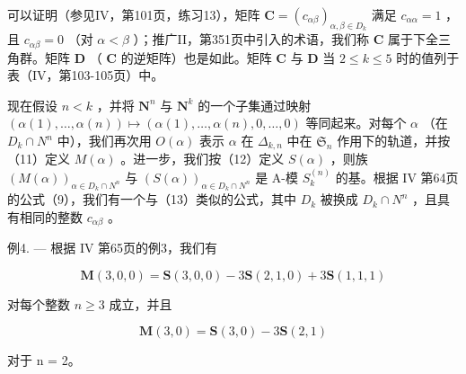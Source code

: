 可以证明（参见IV，第101页，练习13），矩阵 \(\mathbf{C} = (c_{\alpha \beta})_{\alpha, \beta \in D_k}\) 满足 \(c_{\alpha \alpha} = 1\) ，且 \(c_{\alpha \beta} = 0\) （对 \(\alpha < \beta\) ）；推广II，第351页中引入的术语，我们称 \(\mathbf{C}\) 属于下全三角群。矩阵 \(\mathbf{D}\) （ \(\mathbf{C}\) 的逆矩阵）也是如此。矩阵 \(\mathbf{C}\) 与 \(\mathbf{D}\) 当 \(2 \leqslant k \leqslant 5\) 时的值列于表（IV，第103-105页）中。

现在假设 \(n < k\) ，并将 \(\mathbf{N}^n\) 与 \(\mathbf{N}^k\) 的一个子集通过映射 \((\alpha(1), \ldots, \alpha(n)) \mapsto (\alpha(1), \ldots, \alpha(n), 0, \ldots, 0)\) 等同起来。对每个 \(\alpha\) （在 \(D_k \cap N^n\) 中），我们再次用 \(O(\alpha)\) 表示 \(\alpha\) 在 \(\Delta_{k,n}\) 中在 \(\mathfrak{S}_n\) 作用下的轨道，并按（11）定义 \(M(\alpha)\) 。进一步，我们按（12）定义 \(S(\alpha)\) ，则族 \((M(\alpha))_{\alpha \in D_k \cap N^n}\) 与 \((S(\alpha))_{\alpha \in D_k \cap N^n}\) 是 A-模 \(S_k^{(n)}\) 的基。根据 IV 第64页的公式（9），我们有一个与（13）类似的公式，其中 \(D_k\) 被换成 \(D_k \cap N^n\) ，且具有相同的整数 \(c_{\alpha\beta}\) 。

例4. --- 根据 IV 第65页的例3，我们有

\[
\mathbf {M} (3, 0, 0) = \mathbf {S} (3, 0, 0) - 3 \mathbf {S} (2, 1, 0) + 3 \mathbf {S} (1, 1, 1)
\]

对每个整数 \(n \geqslant 3\) 成立，并且

\[
\mathbf {M} (3, 0) = \mathbf {S} (3, 0) - 3 \mathbf {S} (2, 1)
\]

对于 n = 2。

